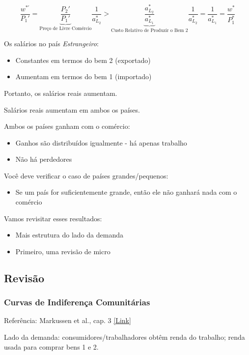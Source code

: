 \documentclass[a4paper,12pt]{article}[abntex2]
\begin{document}
\[
\frac{w^{*'}}{P_1'} = \underbrace{\frac{P_2'}{P_1'}}_\text{Preço de Livre Comércio} \frac{1}{a_{L_2}^*} > \underbrace{\frac{a_{L_2}^*}{a_{L_1}^*}}_\text{Custo Relativo de Produzir o Bem 2} \frac{1}{a_{L_2}^*} = \frac{1}{a_{L_1}^*} = \frac{w^*}{P_1^*}
\]

Os salários no país \textit{Estrangeiro}:
\begin{itemize}
    \item Constantes em termos do bem 2 (exportado)
    \item Aumentam em termos do bem 1 (importado)
\end{itemize}

Portanto, os salários reais aumentam.

Salários reais aumentam em ambos os países.

Ambos os países ganham com o comércio:
\begin{itemize}
    \item Ganhos são distribuídos igualmente - há apenas trabalho
    \item Não há perdedores
\end{itemize}

Você deve verificar o caso de países grandes/pequenos:
\begin{itemize}
    \item Se um país for suficientemente grande, então ele não ganhará nada com o comércio
\end{itemize}

Vamos revisitar esses resultados:
\begin{itemize}
    \item Mais estrutura do lado da demanda
    \item Primeiro, uma revisão de micro
\end{itemize}


\subsection{\textbf{Revisão}}
\subsubsection{\textbf{Curvas de Indiferença Comunitárias}}

Referência: Markussen et al., cap. 3 \href{https://mpra.ub.uni-muenchen.de/21989/1/MPRA_paper_21989.pdf}{[Link]}

Lado da demanda: consumidores/trabalhadores obtêm renda do trabalho; renda usada para comprar bens 1 e 2.
\end{document}
